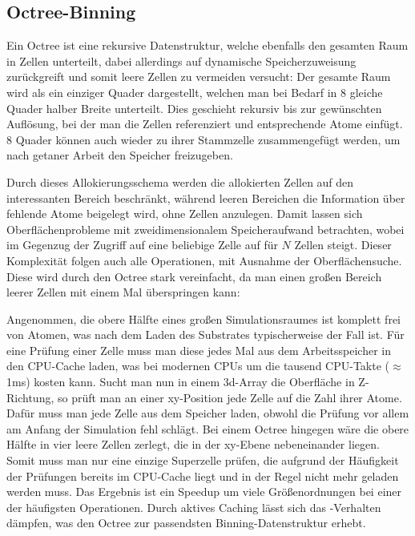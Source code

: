 \subsection{Octree-Binning}

Ein Octree ist eine rekursive Datenstruktur, welche ebenfalls den gesamten Raum in Zellen unterteilt, dabei allerdings auf dynamische Speicherzuweisung zurückgreift und somit leere Zellen zu vermeiden versucht:
Der gesamte Raum wird als ein einziger Quader dargestellt, welchen man bei Bedarf in 8 gleiche Quader halber Breite unterteilt.
Dies geschieht rekursiv bis zur gewünschten Auflösung, bei der man die Zellen referenziert und entsprechende Atome einfügt.
8 Quader können auch wieder zu ihrer Stammzelle zusammengefügt werden, um nach getaner Arbeit den Speicher freizugeben.

Durch dieses Allokierungsschema werden die allokierten Zellen auf den interessanten Bereich beschränkt, während leeren Bereichen die Information über fehlende Atome beigelegt wird, ohne Zellen anzulegen.
Damit lassen sich Oberflächenprobleme mit zweidimensionalem Speicheraufwand betrachten, wobei im Gegenzug der Zugriff auf eine beliebige Zelle auf  für $N$ Zellen steigt.
Dieser Komplexität folgen auch alle Operationen, mit Ausnahme der Oberflächensuche.
Diese wird durch den Octree stark vereinfacht, da man einen großen Bereich leerer Zellen mit einem Mal überspringen kann:

Angenommen, die obere Hälfte eines großen Simulationsraumes ist komplett frei von Atomen, was nach dem Laden des Substrates typischerweise der Fall ist.
Für eine Prüfung einer Zelle muss man diese jedes Mal aus dem Arbeitsspeicher in den CPU-Cache laden, was bei modernen CPUs um die tausend CPU-Takte ($\approx$1ms) kosten kann.
Sucht man nun in einem 3d-Array die Oberfläche in Z-Richtung, so prüft man an einer xy-Position jede Zelle auf die Zahl ihrer Atome.
Dafür muss man jede Zelle aus dem Speicher laden, obwohl die Prüfung vor allem am Anfang der Simulation fehl schlägt.
Bei einem Octree hingegen wäre die obere Hälfte in vier leere Zellen zerlegt, die in der xy-Ebene nebeneinander liegen.
Somit muss man nur eine einzige Superzelle prüfen, die aufgrund der Häufigkeit der Prüfungen bereits im CPU-Cache liegt und in der Regel nicht mehr geladen werden muss.
Das Ergebnis ist ein Speedup um viele Größenordnungen bei einer der häufigsten Operationen.
Durch aktives Caching lässt sich das -Verhalten dämpfen, was den Octree zur passendsten Binning-Datenstruktur erhebt.

